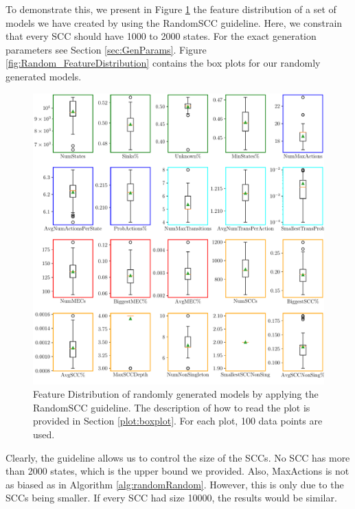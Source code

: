 To demonstrate this, we present in Figure \ref{fig:RandomSCC_FeatureDistributions} the feature distribution of a set of models we have created by using the RandomSCC guideline.
Here, we constrain that every SCC should have 1000 to 2000 states. For the exact generation parameters see Section \ref{sec:GenParams}.
Figure \ref{fig:Random_FeatureDistribution} contains the box plots for our randomly generated models.
\begin{figure}[h!]
    \centering
    \includegraphics[width=1\textwidth]{figures/RandomSCC_FeatureDistribution.pdf}
    \caption[Feature Distribution of randomly generated models with the RandomSCC guideline]{
        Feature Distribution of randomly generated models by applying the RandomSCC guideline. The description of how to read the plot is provided in Section \ref{plot:boxplot}.
        For each plot, 100 data points are used.
    }
    \label{fig:RandomSCC_FeatureDistributions}
\end{figure}
\FloatBarrier

\label{insights:sccDistribution}
Clearly, the guideline allows us to control the size of the SCCs. No SCC has more than 2000 states, which is the upper bound we provided.
Also, MaxActions is not as biased as in Algorithm \ref{alg:randomRandom}. However, this is only due to the SCCs being smaller.
If every SCC had size 10000, the results would be similar.

